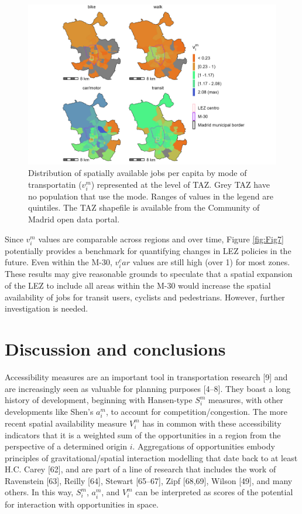 \documentclass[10pt,letterpaper]{article}
\begin{document}
\begin{figure}

{\centering \includegraphics[width=0.85\linewidth]{images/Fig7} 

}

\caption{\label{fig:Fig7} Distribution of spatially available jobs per capita by mode of transportatin ($v_i^m$) represented at the level of TAZ. Grey TAZ have no population that use the mode. Ranges of values in the legend are quintiles. The TAZ shapefile is available from the Community of Madrid open data portal.}\label{fig:SA-per-capita-m-plot}
\end{figure}

Since \(v_i^m\) values are comparable across regions and over time,
Figure \ref{fig:Fig7} potentially provides a benchmark for quantifying
changes in LEZ policies in the future. Even within the M-30, \(v_i^car\)
values are still high (over 1) for most zones. These results may give
reasonable grounds to speculate that a spatial expansion of the LEZ to
include all areas within the M-30 would increase the spatial
availability of jobs for transit users, cyclists and pedestrians.
However, further investigation is needed.

\hypertarget{discussion-and-conclusions}{%
\section{Discussion and conclusions}\label{discussion-and-conclusions}}

Accessibility measures are an important tool in transportation research
{[}9{]} and are increasingly seen as valuable for planning purposes
{[}4--8{]}. They boast a long history of development, beginning with
Hansen-type \(S_i^m\) measures, with other developments like Shen's
\(a_i^m\), to account for competition/congestion. The more recent
spatial availability measure \(V_i^m\) has in common with these
accessibility indicators that it is a weighted sum of the opportunities
in a region from the perspective of a determined origin \(i\).
Aggregations of opportunities embody principles of gravitational/spatial
interaction modelling that date back to at least H.C. Carey {[}62{]},
and are part of a line of research that includes the work of Ravenstein
{[}63{]}, Reilly {[}64{]}, Stewart {[}65--67{]}, Zipf {[}68,69{]},
Wilson {[}49{]}, and many others. In this way, \(S_i^m\), \(a_i^m\), and
\(V_i^m\) can be interpreted as scores of the potential for interaction
with opportunities in space.
\end{document}
